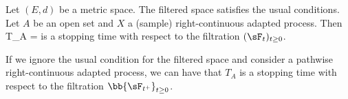 \begin{proposition}\label{pro:right_continuous_open_set_stopping_time}%
Let $(E,d)$ be a metric space. The filtered space satisfies the usual conditions. Let $A$ be an open set and $X$ a (sample) right-continuous adapted process. Then \be T_A = \inf{} \ee is a stopping
time with respect to the filtration $(\sF_t)_{t\geq 0}$.


If we ignore the usual condition for the filtered space and consider a pathwise right-continuous adapted process, we can have that $T_A$ is a stopping time with respect to the filtration $\bb{\sF_{t^+}}_{t\geq 0}$.
\end{proposition}


